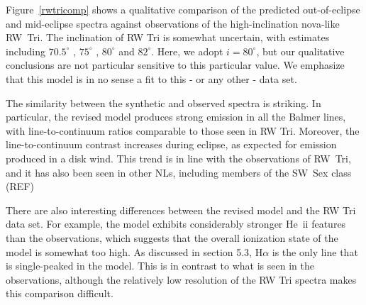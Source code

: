 \documentclass[preprint, a4paper, 11pt]{aastex}
\begin{document}
Figure~\ref{rwtricomp} shows a qualitative comparison of the predicted
out-of-eclipse and mid-eclipse spectra against observations of the
high-inclination nova-like RW~Tri. The inclination of RW Tri is
somewhat uncertain, with estimates including $70.5^\circ$
\citep{smak1995}, $75^\circ$ \citep{groot2004}, $80^\circ$
\citep{longmore1981} and $82^\circ$\citep{frankking1981}. Here, we
adopt $i = 80^\circ$, but our qualitative conclusions are not
particular sensitive to this particular value. We emphasize that this
model is in no sense a fit to this - or any other - data set.


The similarity between the synthetic and observed spectra is
striking. In particular, the revised model produces strong emission in
all the Balmer lines, with line-to-continuum ratios comparable to
those seen in RW Tri. Moreover, the line-to-continuum contrast
increases during eclipse, as expected for emission produced in a disk
wind. This trend is in line with the observations of RW~Tri, and it
has also been seen in other NLs, including members of the SW~Sex class
(REF) 

There are also interesting differences between the revised
model and the RW Tri data set. For example, the model exhibits
considerably stronger He~{\sc ii} features than the observations,
which suggests that the overall ionization state of the model is
somewhat too high. 
As discussed in section 5.3, H$\alpha$ is the only line
that is single-peaked in the model. This is
in contrast to what is seen in the observations,
although the relatively low resolution of the RW Tri
spectra makes this comparison difficult.
\end{document}
